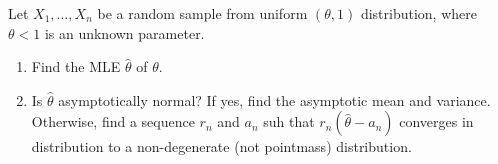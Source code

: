 
\begin{exercise}

Let $X_1, \dots, X_n$ be a random sample from uniform $(\theta, 1)$ distribution, where $\theta < 1$ is an unknown parameter.

\begin{enumerate}[label = (\alph*)]

    \item Find the MLE $\hat \theta$ of $\theta$.

    \item Is $\hat \theta$ asymptotically normal?
    If yes, find the asymptotic mean and variance.
    Otherwise, find a sequence $r_n$ and $a_n$ suh that $r_n (\hat \theta - a_n)$ converges in distribution to a non-degenerate (not pointmass) distribution.

\end{enumerate}

\end{exercise}


